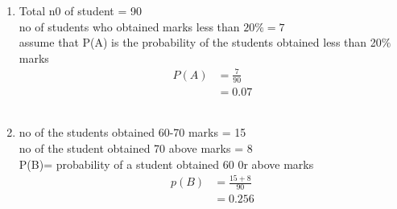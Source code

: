 \renewcommand{\theequation}{\theenumi}
\begin{enumerate}[label=\arabic*.,ref=\thesubsection.\theenumi]
\item Total n0 of student = 90
\\
no of students who obtained marks less than $20\%= 7$
\\
assume that P(A) is the probability of the students obtained less than 20$\%$ marks 
\begin{align}
	P\left(A\right) &= \frac{7}{90}
	\\
	&=0.07
\end{align}
\\
\item no of the students obtained 60-70 marks = 15
\\
no of the student obtained 70 above marks = 8
\\
P(B)= probability of a student obtained 60 0r above marks 
\begin{align}
p\left(B\right) &= \frac{15 + 8}{90}
\\
&= 0.256
\end{align}
\end{enumerate}